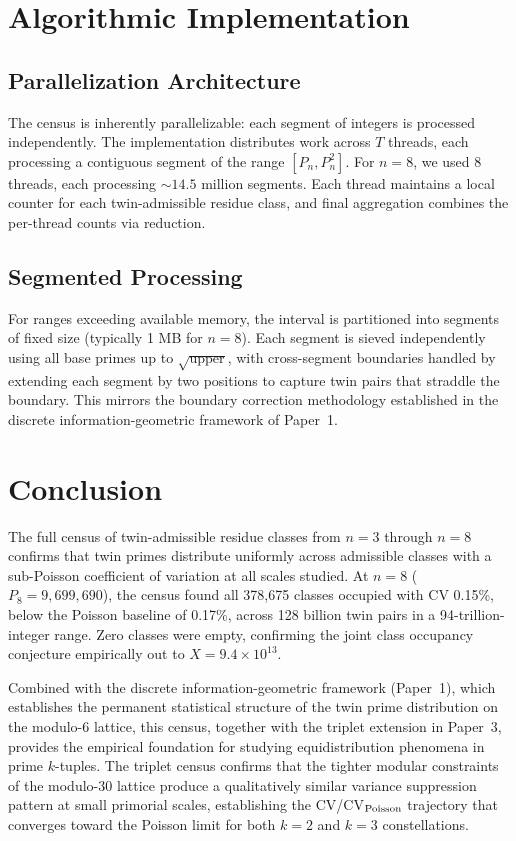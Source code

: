 \documentclass[11pt]{article}
\begin{document}
\section{Algorithmic Implementation}
\label{sec:implementation}

\subsection{Parallelization Architecture}

The census is inherently parallelizable: each segment of integers is processed independently. The implementation distributes work across $T$ threads, each processing a contiguous segment of the range $[P_n, P_n^2]$. For $n=8$, we used 8 threads, each processing $\sim 14.5$ million segments. Each thread maintains a local counter for each twin-admissible residue class, and final aggregation combines the per-thread counts via reduction.

\subsection{Segmented Processing}

For ranges exceeding available memory, the interval is partitioned into segments of fixed size (typically 1 MB for $n=8$). Each segment is sieved independently using all base primes up to $\sqrt{\text{upper}}$, with cross-segment boundaries handled by extending each segment by two positions to capture twin pairs that straddle the boundary. This mirrors the boundary correction methodology established in the discrete information-geometric framework of Paper~1.

\section{Conclusion}
\label{sec:conclusion}

The full census of twin-admissible residue classes from $n=3$ through $n=8$ confirms that twin primes distribute uniformly across admissible classes with a sub-Poisson coefficient of variation at all scales studied. At $n=8$ ($P_8 = 9{,}699{,}690$), the census found all 378{,}675 classes occupied with CV 0.15\%, below the Poisson baseline of 0.17\%, across 128 billion twin pairs in a 94-trillion-integer range. Zero classes were empty, confirming the joint class occupancy conjecture empirically out to $X = 9.4 \times 10^{13}$.

Combined with the discrete information-geometric framework (Paper~1), which establishes the permanent statistical structure of the twin prime distribution on the modulo-6 lattice, this census, together with the triplet extension in Paper~3, provides the empirical foundation for studying equidistribution phenomena in prime $k$-tuples. The triplet census confirms that the tighter modular constraints of the modulo-30 lattice produce a qualitatively similar variance suppression pattern at small primorial scales, establishing the CV/CV$_{\rm Poisson}$ trajectory that converges toward the Poisson limit for both $k=2$ and $k=3$ constellations.
\end{document}
